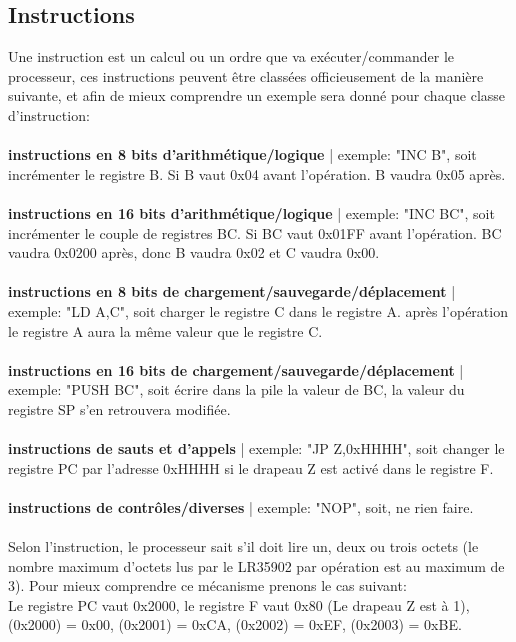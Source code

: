\documentclass{report}
\begin{document}
\subsection{Instructions}
Une instruction est un calcul ou un ordre que va exécuter/commander le processeur, ces instructions peuvent être classées officieusement de la manière suivante, et afin de mieux comprendre un exemple sera donné pour chaque classe d'instruction:\\\\
\textbf{instructions en 8 bits d'arithmétique/logique} | exemple: "INC B", soit incrémenter le registre B. Si B vaut 0x04 avant l'opération. B vaudra 0x05 après.\\\\
\textbf{instructions en 16 bits d'arithmétique/logique} | exemple: "INC BC", soit incrémenter le couple de registres BC. Si BC vaut 0x01FF avant l'opération. BC vaudra 0x0200 après, donc B vaudra 0x02 et C vaudra 0x00.\\\\
\textbf{instructions en 8 bits de chargement/sauvegarde/déplacement} | exemple: "LD A,C", soit charger le registre C dans le registre A. après l'opération le registre A aura la même valeur que le registre C.\\\\
\textbf{instructions en 16 bits de chargement/sauvegarde/déplacement} | exemple: "PUSH BC", soit écrire dans la pile la valeur de BC, la valeur du registre SP s'en retrouvera modifiée.\\\\
\textbf{instructions de sauts et d'appels} | exemple: "JP Z,0xHHHH", soit changer le registre PC par l'adresse 0xHHHH si le drapeau Z est activé dans le registre F.\\\\
\textbf{instructions de contrôles/diverses} | exemple: "NOP", soit, ne rien faire.\\\\
Selon l'instruction, le processeur sait s'il doit lire un, deux ou trois octets (le nombre maximum d'octets lus par le LR35902 par opération est au maximum de 3). Pour mieux comprendre ce mécanisme prenons le cas suivant:\\ 
Le registre PC vaut 0x2000, le registre F vaut 0x80 (Le drapeau Z est à 1), (0x2000) = 0x00, (0x2001) = 0xCA, (0x2002) = 0xEF, (0x2003) = 0xBE.
\end{document}
